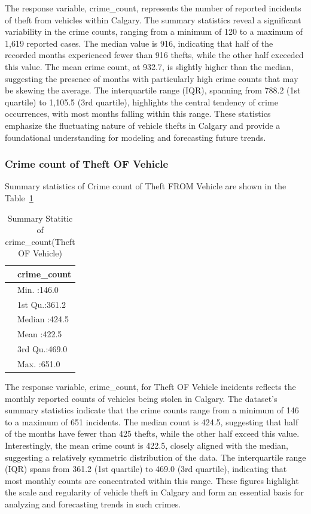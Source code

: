 \documentclass[
  letterpaper,
  DIV=11,
  numbers=noendperiod]{scrartcl}
\begin{document}
The response variable, crime\_count, represents the number of reported
incidents of theft from vehicles within Calgary. The summary statistics
reveal a significant variability in the crime counts, ranging from a
minimum of 120 to a maximum of 1,619 reported cases. The median value is
916, indicating that half of the recorded months experienced fewer than
916 thefts, while the other half exceeded this value. The mean crime
count, at 932.7, is slightly higher than the median, suggesting the
presence of months with particularly high crime counts that may be
skewing the average. The interquartile range (IQR), spanning from 788.2
(1st quartile) to 1,105.5 (3rd quartile), highlights the central
tendency of crime occurrences, with most months falling within this
range. These statistics emphasize the fluctuating nature of vehicle
thefts in Calgary and provide a foundational understanding for modeling
and forecasting future trends.

\subsubsection{Crime count of Theft OF
Vehicle}\label{crime-count-of-theft-of-vehicle}

Summary statistics of Crime count of Theft FROM Vehicle are shown in the
Table~\ref{tbl-response-theftofvehicle}

\begin{longtable}[]{@{}ll@{}}

\caption{\label{tbl-response-theftofvehicle}Summary Statitic of
crime\_count(Theft OF Vehicle)}

\tabularnewline

\toprule\noalign{}
& crime\_count \\
\midrule\noalign{}
\endhead
\bottomrule\noalign{}
\endlastfoot
& Min. :146.0 \\
& 1st Qu.:361.2 \\
& Median :424.5 \\
& Mean :422.5 \\
& 3rd Qu.:469.0 \\
& Max. :651.0 \\

\end{longtable}

The response variable, crime\_count, for Theft OF Vehicle incidents
reflects the monthly reported counts of vehicles being stolen in
Calgary. The dataset's summary statistics indicate that the crime counts
range from a minimum of 146 to a maximum of 651 incidents. The median
count is 424.5, suggesting that half of the months have fewer than 425
thefts, while the other half exceed this value. Interestingly, the mean
crime count is 422.5, closely aligned with the median, suggesting a
relatively symmetric distribution of the data. The interquartile range
(IQR) spans from 361.2 (1st quartile) to 469.0 (3rd quartile),
indicating that most monthly counts are concentrated within this range.
These figures highlight the scale and regularity of vehicle theft in
Calgary and form an essential basis for analyzing and forecasting trends
in such crimes.
\end{document}
